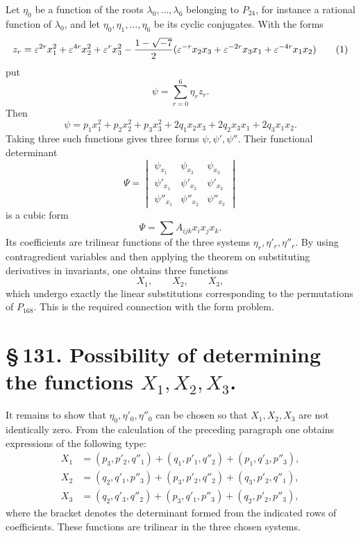 \documentclass[11pt]{article}
\newcommand{\eps}{\varepsilon}
\begin{document}
Let \(\eta_0\) be a function of the roots \(\lambda_0,\ldots,\lambda_6\) belonging to \(P_{24}\), for instance a rational function of \(\lambda_0\), and let \(\eta_0,\eta_1,\ldots,\eta_6\) be its cyclic conjugates. With the forms
\begin{equation}
z_r=\eps^{2r}x_1^2+\eps^{4r}x_2^2+\eps^rx_3^2-{1-\sqrt{-7}\over2}(\eps^{-r}x_2x_3+\eps^{-2r}x_3x_1+\eps^{-4r}x_1x_2)
\tag{1}
\end{equation}
put
\begin{equation}
\psi=\sum_{r=0}^6\eta_r z_r.
\tag{2}
\end{equation}
Then
\begin{equation}
\psi=p_1x_1^2+p_2x_2^2+p_3x_3^2+2q_1x_2x_3+2q_2x_3x_1+2q_3x_1x_2.
\tag{3}
\end{equation}
Taking three such functions gives three forms \(\psi,\psi',\psi''\). Their functional determinant
\begin{equation}
\Psi=
\begin{vmatrix}
\psi_{x_1}&\psi_{x_2}&\psi_{x_3}\\
\psi'_{x_1}&\psi'_{x_2}&\psi'_{x_3}\\
\psi''_{x_1}&\psi''_{x_2}&\psi''_{x_3}
\end{vmatrix}
\tag{4}
\end{equation}
is a cubic form
\begin{equation}
\Psi=\sum A_{ijk}x_ix_jx_k.
\tag{5}
\end{equation}
Its coefficients are trilinear functions of the three systems \(\eta_r,\eta'_r,\eta''_r\). By using contragredient variables and then applying the theorem on substituting derivatives in invariants, one obtains three functions
\begin{equation}
X_1,
\qquad X_2,
\qquad X_3,
\tag{6}
\end{equation}
which undergo exactly the linear substitutions corresponding to the permutations of \(P_{168}\). This is the required connection with the form problem.

\section*{\S\,131. Possibility of determining the functions \(X_1,X_2,X_3\).}

It remains to show that \(\eta_0,\eta'_0,\eta''_0\) can be chosen so that \(X_1,X_2,X_3\) are not identically zero. From the calculation of the preceding paragraph one obtains expressions of the following type:
\begin{equation}
\begin{aligned}
X_1&=(p_3,p'_2,q''_1)+(q_1,p'_1,q''_2)+(p_1,q'_3,p''_3),\\
X_2&=(q_2,q'_1,p''_3)+(p_3,p'_2,q''_2)+(q_3,p'_2,q''_1),\\
X_3&=(q_2,q'_3,q''_2)+(p_3,q'_1,p''_3)+(q_2,p'_2,p''_3),
\end{aligned}
\tag{1}
\end{equation}
where the bracket denotes the determinant formed from the indicated rows of coefficients. These functions are trilinear in the three chosen systems.
\end{document}
